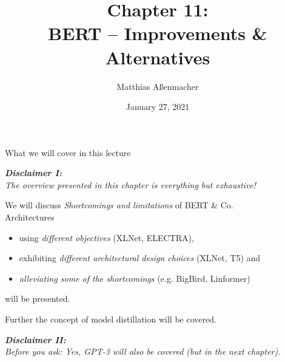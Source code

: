 \documentclass[]{beamer}
\title[BERT -- Improvements \& Alternatives]{Chapter 11: \\ BERT -- Improvements \& Alternatives}
\author{Matthias Aßenmacher}
\date{January 27, 2021}
\begin{document}
\begin{frame}
\titlepage
\end{frame}


\begin{frame}{What we will cover in this lecture}

{\it \textbf{Disclaimer I:}\\The overview presented in this chapter is everything but exhaustive!}\\

\vspace{.5cm}

We will discuss \textit{Shortcomings and limitations} of BERT \& Co.\\
\vspace{.25cm}
Architectures 
		\begin{itemize}
			\item using \textit{different objectives} (XLNet, ELECTRA),
			\item exhibiting \textit{different architectural design choices} (XLNet, T5) and
			\item \textit{alleviating some of the shortcomings} (e.g. BigBird, Linformer)
		\end{itemize}
		will be presented.
		
\vspace{.25cm}

Further the concept of model distillation will be covered.\\
		
\vspace{.5cm}

{\it \textbf{Disclaimer II:}\\
Before you ask: Yes, GPT-3 will also be covered (but in the next chapter).}\\
\end{frame}
\end{document}
